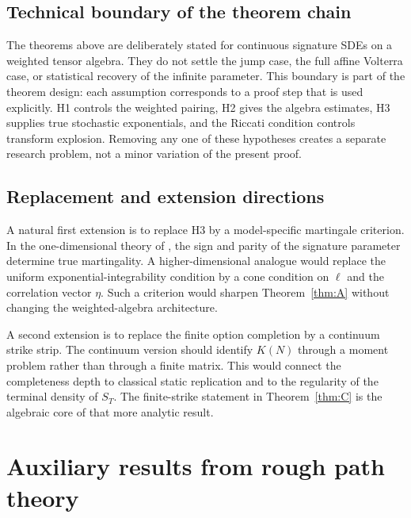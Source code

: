 \documentclass[11pt,oneside]{article}
\theoremstyle{plain}
\theoremstyle{definition}
\theoremstyle{remark}
\begin{document}
\subsection{Technical boundary of the theorem chain}
The theorems above are deliberately stated for continuous signature SDEs on a weighted tensor algebra. They do not settle the jump case, the full affine Volterra case, or statistical recovery of the infinite parameter. This boundary is part of the theorem design: each assumption corresponds to a proof step that is used explicitly. H1 controls the weighted pairing, H2 gives the algebra estimates, H3 supplies true stochastic exponentials, and the Riccati condition controls transform explosion. Removing any one of these hypotheses creates a separate research problem, not a minor variation of the present proof.

\subsection{Replacement and extension directions}
A natural first extension is to replace H3 by a model-specific martingale criterion. In the one-dimensional theory of \citet{AbiJaberGassiatSotnikov2025}, the sign and parity of the signature parameter determine true martingality. A higher-dimensional analogue would replace the uniform exponential-integrability condition by a cone condition on $\ell$ and the correlation vector $\eta$. Such a criterion would sharpen Theorem~\ref{thm:A} without changing the weighted-algebra architecture.

A second extension is to replace the finite option completion by a continuum strike strip. The continuum version should identify $K(N)$ through a moment problem rather than through a finite matrix. This would connect the completeness depth to classical static replication and to the regularity of the terminal density of $S_T$. The finite-strike statement in Theorem~\ref{thm:C} is the algebraic core of that more analytic result.



\appendix

\section{Auxiliary results from rough path theory}\label{app:rough-paths}
\end{document}
